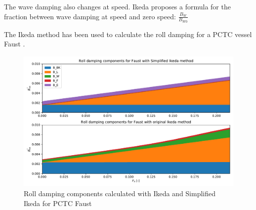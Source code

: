 The wave damping also changes at speed. Ikeda \cite{ikeda_components_1978} proposes a formula for the fraction between wave damping at speed and zero speed: $\frac{B_W}{B_{W0}}$

The Ikeda method has been used to calculate the roll damping for a PCTC vessel Faust \cite{soder_assessment_2019}.







\begin{figure}[h]
    \centering
    \includegraphics[height=7cm, width=14cm]{figures/ikeda_vs_simplified.pdf}
    \caption{Roll damping components calculated with Ikeda and Simplified Ikeda for PCTC Faust}
    \label{fig:ikeda_vs_simplified}
\end{figure}
